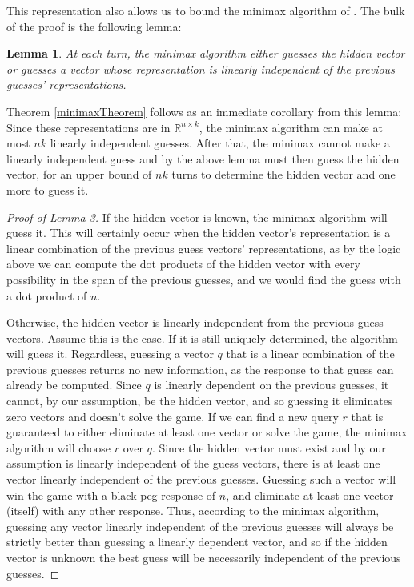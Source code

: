 \documentclass[12pt, a4paper]{article}
\newcommand{\R}{\mathbb{R}}           %
\newtheorem{lemma}{Lemma}
\begin{document}
This representation also allows us to bound the minimax algorithm of \cite{DK76}. The bulk of the proof is the following lemma:
\begin{lemma}
	At each turn, the minimax algorithm either guesses the hidden vector or guesses a vector whose representation is linearly independent of the previous guesses' representations.
\end{lemma}
Theorem \ref{minimaxTheorem} follows as an immediate corollary from this lemma: Since these representations are in $\R^{n \times k}$, the minimax algorithm can make at most $nk$ linearly independent guesses. After that, the minimax cannot make a linearly independent guess and by the above lemma must then guess the hidden vector, for an upper bound of $nk$ turns to determine the hidden vector and one more to guess it.
\begin{proof}[Proof of Lemma 3]
	If the hidden vector is known, the minimax algorithm will guess it. This will certainly occur when the hidden vector's representation is a linear combination of the previous guess vectors' representations, as by the logic above we can compute the dot products of the hidden vector with every possibility in the span of the previous guesses, and we would find the guess with a dot product of $n$.
	
	Otherwise, the hidden vector is linearly independent from the previous guess vectors. Assume this is the case. If it is still uniquely determined, the algorithm will guess it. Regardless, guessing a vector $q$ that is a linear combination of the previous guesses returns no new information, as the response to that guess can already be computed. Since $q$ is linearly dependent on the previous guesses, it cannot, by our assumption, be the hidden vector, and so guessing it eliminates zero vectors and doesn't solve the game. If we can find a new query $r$ that is guaranteed to either eliminate at least one vector or solve the game, the minimax algorithm will choose $r$ over $q$. Since the hidden vector must exist and by our assumption is linearly independent of the guess vectors, there is at least one vector linearly independent of the previous guesses. Guessing such a vector will win the game with a black-peg response of $n$, and eliminate at least one vector (itself) with any other response. Thus, according to the minimax algorithm, guessing any vector linearly independent of the previous guesses will always be strictly better than guessing a linearly dependent vector, and so if the hidden vector is unknown the best guess will be necessarily independent of the previous guesses.
\end{proof}
\end{document}

